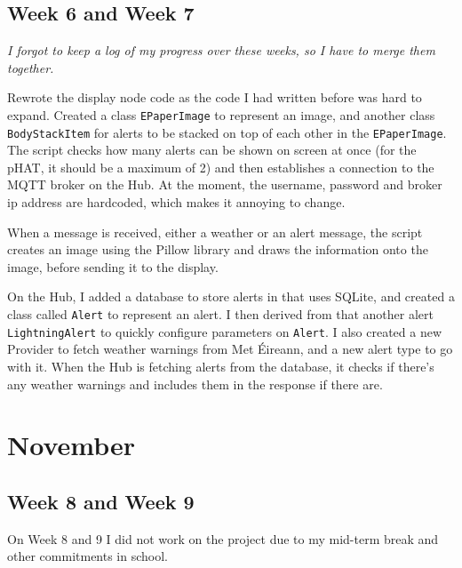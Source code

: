 \documentclass{report}
\begin{document}
	\section{Week 6 and Week 7} %
	\begin{small}\begin{center}
			\textit{I forgot to keep a log of my progress over these weeks, so I have to merge them together.}
	\end{center}\end{small}

	Rewrote the display node code as the code I had written before was hard to expand. Created a class \texttt{EPaperImage} to represent an image, and another class \texttt{BodyStackItem} for alerts to be stacked on top of each other in the \texttt{EPaperImage}. The script checks how many alerts can be shown on screen at once (for the pHAT, it should be a maximum of 2) and then establishes a connection to the MQTT broker on the Hub. At the moment, the username, password and broker ip address are hardcoded, which makes it annoying to change.
	
	When a message is received, either a weather or an alert message, the script creates an image using the Pillow library and draws the information onto the image, before sending it to the display. 
	
	On the Hub, I added a database to store alerts in that uses SQLite, and created a class called \texttt{Alert} to represent an alert. I then derived from that another alert \texttt{LightningAlert} to quickly configure parameters on \texttt{Alert}. I also created a new Provider to fetch weather warnings from Met Éireann, and a new alert type to go with it. When the Hub is fetching alerts from the database, it checks if there's any weather warnings and includes them in the response if there are. 
	
	\chapter{November}
	\section{Week 8 and Week 9}
		On Week 8 and 9 I did not work on the project due to my mid-term break and other commitments in school.
			
\end{document}
